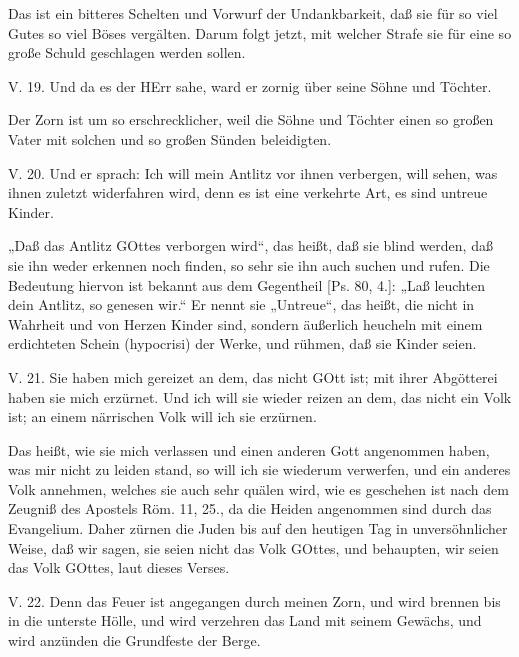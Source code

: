 Das ist ein bitteres Schelten und Vorwurf der Undankbarkeit, daß sie für so viel Gutes so viel Böses vergälten. Darum folgt jetzt, mit welcher Strafe sie für eine so große Schuld geschlagen werden sollen.

\begin{schriftzitat}
V. 19. Und da es der HErr sahe, ward er zornig über seine Söhne und Töchter.
\end{schriftzitat}

Der Zorn ist um so erschrecklicher, weil die Söhne und Töchter einen so großen Vater mit solchen und so großen Sünden beleidigten.

\begin{schriftzitat}
V. 20. Und er sprach: Ich will mein Antlitz vor ihnen verbergen, will sehen, was ihnen zuletzt widerfahren wird, denn es ist eine verkehrte Art, es sind untreue Kinder.
\end{schriftzitat}

„Daß das Antlitz GOttes verborgen wird“, das heißt, daß sie blind werden, daß sie ihn weder erkennen noch finden, so sehr sie ihn auch suchen und rufen. Die Bedeutung hiervon ist bekannt aus dem Gegentheil [Ps. 80, 4.]: „Laß leuchten dein Antlitz, so genesen wir.“ Er nennt sie „Untreue“, das heißt, die nicht in Wahrheit und von Herzen Kinder sind, sondern äußerlich heucheln mit einem erdichteten Schein (hypocrisi) der Werke, und rühmen, daß sie Kinder seien.

\begin{schriftzitat}
V. 21. Sie haben mich gereizet an dem, das nicht GOtt ist; mit ihrer Abgötterei haben sie mich erzürnet. Und ich will sie wieder reizen an dem, das nicht ein Volk ist; an einem närrischen Volk will ich sie erzürnen.
\end{schriftzitat}

Das heißt, wie sie mich verlassen und einen anderen Gott angenommen haben, was mir nicht zu leiden stand, so will ich sie wiederum verwerfen, und ein anderes Volk annehmen, welches sie auch sehr quälen wird, wie es geschehen ist nach dem Zeugniß des Apostels Röm. 11, 25., da die Heiden angenommen sind durch das Evangelium. Daher zürnen die Juden bis auf den heutigen Tag in unversöhnlicher Weise, daß wir sagen, sie seien nicht das Volk GOttes, und behaupten, wir seien das Volk GOttes, laut dieses Verses.

\begin{schriftzitat}
V. 22. Denn das Feuer ist angegangen durch meinen Zorn, und wird brennen bis in die unterste Hölle, und wird verzehren das Land mit seinem Gewächs, und wird anzünden die Grundfeste der Berge.
\end{schriftzitat}

